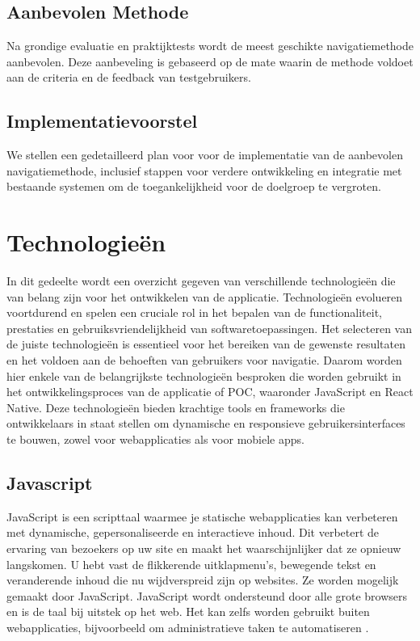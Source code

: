 \subsection{Aanbevolen Methode}
Na grondige evaluatie en praktijktests wordt de meest geschikte navigatiemethode aanbevolen. Deze aanbeveling is gebaseerd op de mate waarin de methode voldoet aan de criteria en de feedback van testgebruikers.

\subsection{Implementatievoorstel}
We stellen een gedetailleerd plan voor voor de implementatie van de aanbevolen navigatiemethode, inclusief stappen voor verdere ontwikkeling en integratie met bestaande systemen om de toegankelijkheid voor de doelgroep te vergroten.

\section{Technologieën}
\label{sec:technologieën}


In dit gedeelte wordt een overzicht gegeven van verschillende technologieën die van belang zijn voor het ontwikkelen van de applicatie. Technologieën evolueren voortdurend en spelen een cruciale rol in het bepalen van de functionaliteit, prestaties en gebruiksvriendelijkheid van softwaretoepassingen. Het selecteren van de juiste technologieën is essentieel voor het bereiken van de gewenste resultaten en het voldoen aan de behoeften van gebruikers voor navigatie. Daarom worden hier enkele van de belangrijkste technologieën besproken die worden gebruikt in het ontwikkelingsproces van de applicatie of POC, waaronder JavaScript en React Native. Deze technologieën bieden krachtige tools en frameworks die ontwikkelaars in staat stellen om dynamische en responsieve gebruikersinterfaces te bouwen, zowel voor webapplicaties als voor mobiele apps.

\subsection{Javascript}
\label{sec:javascript}


JavaScript is een scripttaal waarmee je statische webapplicaties kan verbeteren met dynamische, gepersonaliseerde en interactieve inhoud. Dit verbetert de ervaring van bezoekers op uw site en maakt het waarschijnlijker dat ze opnieuw langskomen. U hebt vast de flikkerende uitklapmenu's, bewegende tekst en veranderende inhoud die nu wijdverspreid zijn op websites. Ze worden mogelijk gemaakt door JavaScript. JavaScript wordt ondersteund door alle grote browsers en is de taal bij uitstek op het web. Het kan zelfs worden gebruikt buiten webapplicaties, bijvoorbeeld om administratieve taken te automatiseren \autocite{Wilton2004}.

